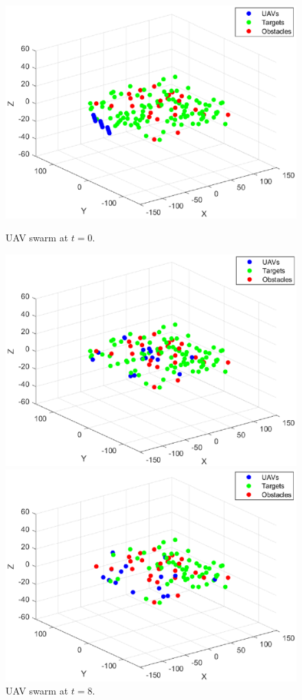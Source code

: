 \documentclass[a4paper,12pt]{report}
\begin{document}
\begin{figure}[H]
  \includegraphics[width=\linewidth]{uav0.eps}
  \caption{UAV swarm at $t = 0$.}
    \endminipage\hfill
  \includegraphics[width=\linewidth]{uav40.eps}
  \caption{UAV swarm at $t = 8$.}
    \endminipage\hfill
  \includegraphics[width=\linewidth]{uav80.eps}

\end{figure}
\end{document}
